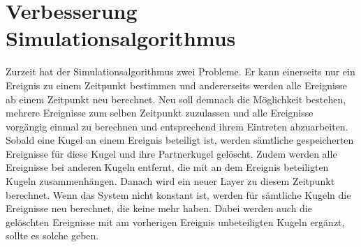 \section{Verbesserung Simulationsalgorithmus}\label{anhang:simulation:algorithmus}

Zurzeit hat der Simulationsalgorithmus zwei Probleme. Er kann einerseits nur ein Ereignis zu einem Zeitpunkt bestimmen und
andererseits werden alle Ereignisse ab einem Zeitpunkt neu berechnet. Neu soll demnach die Möglichkeit bestehen, mehrere
Ereignisse zum selben Zeitpunkt zuzulassen und alle Ereignisse vorgängig einmal zu berechnen und entsprechend ihrem Eintreten
abzuarbeiten. Sobald eine Kugel an einem Ereignis beteiligt ist, werden sämtliche gespeicherten Ereignisse für diese Kugel und
ihre Partnerkugel gelöscht. Zudem werden alle Ereignisse bei anderen Kugeln entfernt, die mit an dem Ereignis beteiligten Kugeln
zusammenhängen. Danach wird ein neuer Layer zu diesem Zeitpunkt berechnet. Wenn das System nicht konstant ist, werden
für sämtliche Kugeln die Ereignisse neu berechnet, die keine mehr haben. Dabei werden auch die gelöschten Ereignisse
mit am vorherigen Ereignis unbeteiligten Kugeln ergänzt, sollte es solche geben.



